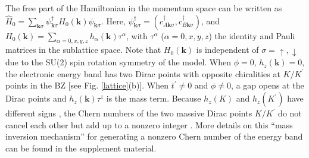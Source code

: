 \documentclass[amsmath,superscriptaddress,showpacs,aps,prl,twocolumn]{revtex4-1}
\begin{document}
\par The free part of the Hamiltonian in the momentum space can be written as $\hat{H}_0=\sum_{\mathbf{k}\sigma}\psi^{\dagger}_{\mathbf{k}\sigma}H_0(\mathbf{k})\psi_{\mathbf{k}\sigma}$. Here, $\psi^{\dagger}_{\mathbf{k}\sigma}=(c^{\dagger}_{A\mathbf{k}\sigma},c^{\dagger}_{B\mathbf{k}\sigma})$, and $H_0(\mathbf{k})=\sum_{\alpha=0,x,y,z}h_\alpha(\mathbf{k})\tau^\alpha$, with $\tau^\alpha$ ($\alpha=0,x,y,z$) the identity and Pauli matrices in the sublattice space. Note that $H_0(\mathbf{k})$ is independent of $\sigma =\uparrow,\downarrow$ due to the SU(2) spin rotation symmetry of the model. When $\phi=0$, $h_z(\mathbf{k})=0$, the electronic energy band has two Dirac points with opposite chiralities at $K/K^\prime$ points in the BZ [see Fig. \ref{lattice}(b)]. When $t^\prime\ne0$ and $\phi\ne0$, a gap opens at the Dirac points and $h_z(\mathbf{k})\tau^z$ is the mass term. Because $h_z(K)$ and $h_z(K^\prime)$ have different signs \cite{Haldane_PRL1988}, the Chern numbers of the two massive Dirac points $K/K^\prime$ do not cancel each other but add up to a nonzero integer \cite{Rachel_RPP2018}. More details on this ``mass inversion mechanism'' for generating a nonzero Chern number of the energy band can be found in the supplement material.
\end{document}
